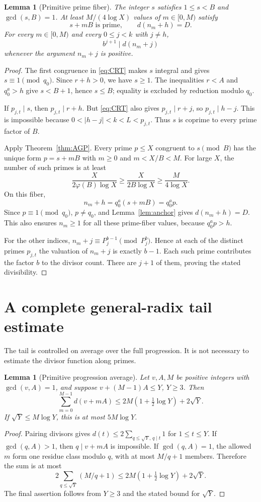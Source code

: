 \documentclass[11pt,a4paper]{article}
\newtheorem{lemma}[theorem]{Lemma}
\theoremstyle{definition}\newtheorem{definition}[theorem]{Definition}
\theoremstyle{remark}\newtheorem{remark}[theorem]{Remark}
\begin{document}
\begin{lemma}[Primitive prime fiber]\label{lem:fiber}
The integer $s$ satisfies $1\le s<B$ and $\gcd(s,B)=1$. At least $M/(4\log X)$ values of $m\in[0,M)$ satisfy
\[
 s+mB\text{ is prime},\qquad d(n_m+h)=D.
\]
For every $m\in[0,M)$ and every $0\le j<k$ with $j\ne h$,
\[
 b^{j+1}\mid d(n_m+j)
\]
whenever the argument $n_m+j$ is positive.
\end{lemma}
\begin{proof}
The first congruence in \eqref{eq:CRT} makes $s$ integral and gives $s\equiv1\pmod {q_0}$. Since $r+h>0$, we have $s\ge1$. The inequalities $r<A$ and $q_0^a>h$ give $s<B+1$, hence $s\le B$; equality is excluded by reduction modulo $q_0$.

If $p_{j,t}\mid s$, then $p_{j,t}\mid r+h$. But \eqref{eq:CRT} also gives $p_{j,t}\mid r+j$, so $p_{j,t}\mid h-j$. This is impossible because $0<|h-j|<k<L<p_{j,t}$. Thus $s$ is coprime to every prime factor of $B$.

Apply Theorem~\ref{thm:AGP}. Every prime $p\le X$ congruent to $s\pmod B$ has the unique form $p=s+mB$ with $m\ge0$ and $m<X/B<M$. For large $X$, the number of such primes is at least
\[
 \frac{X}{2\varphi(B)\log X}\ge\frac{X}{2B\log X}
 \ge\frac{M}{4\log X}.
\]
On this fiber,
\[
 n_m+h=q_0^a(s+mB)=q_0^ap.
\]
Since $p\equiv1\pmod{q_0}$, $p\ne q_0$, and Lemma~\ref{lem:anchor} gives $d(n_m+h)=D$. This also ensures $n_m\ge1$ for all these prime-fiber values, because $q_0^ap>h$.

For the other indices, $n_m+j\equiv P_j^{b-1}\pmod{P_j^b}$. Hence at each of the distinct primes $p_{j,t}$ the valuation of $n_m+j$ is exactly $b-1$. Each such prime contributes the factor $b$ to the divisor count. There are $j+1$ of them, proving the stated divisibility.
\end{proof}

\section{A complete general-radix tail estimate}
The tail is controlled on average over the full progression. It is not necessary to estimate the divisor function along primes.

\begin{lemma}[Primitive progression average]\label{lem:average}
Let $v,A,M$ be positive integers with $\gcd(v,A)=1$, and suppose $v+(M-1)A\le Y$, $Y\ge3$. Then
\[
 \sum_{m=0}^{M-1}d(v+mA)
 \le2M\left(1+\tfrac12\log Y\right)+2\sqrt Y.
\]
If $\sqrt Y\le M\log Y$, this is at most $5M\log Y$.
\end{lemma}
\begin{proof}
Pairing divisors gives $d(t)\le2\sum_{q\le\sqrt Y,\,q\mid t}1$ for $1\le t\le Y$. If $\gcd(q,A)>1$, then $q\mid v+mA$ is impossible. If $\gcd(q,A)=1$, the allowed $m$ form one residue class modulo $q$, with at most $M/q+1$ members. Therefore the sum is at most
\[
 2\sum_{q\le\sqrt Y}(M/q+1)
 \le2M(1+\tfrac12\log Y)+2\sqrt Y.
\]
The final assertion follows from $Y\ge3$ and the stated bound for $\sqrt Y$.
\end{proof}
\end{document}
